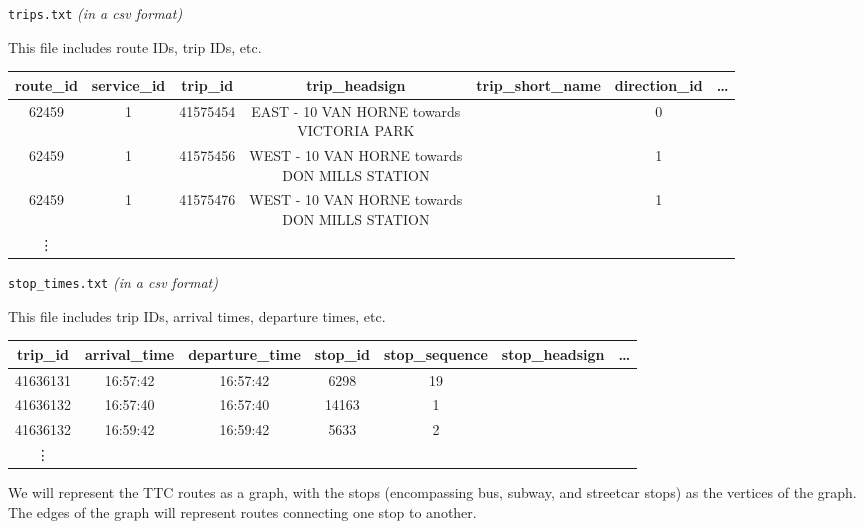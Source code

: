\documentclass[fontsize=11pt]{article}
\begin{document}
    \noindent \texttt{trips.txt} \emph{(in a csv format)}
    
    \noindent This file includes route IDs, trip IDs, etc.
    \begin{center}
    	\begin{tabular}{| c | c | c | c | c | c | c |}
    		\hline 
    		route\_id & service\_id & trip\_id & trip\_headsign & trip\_short\_name & direction\_id & \ldots \\
    		\hline
    		62459 & 1 & 41575454 & \makecell{EAST - 10 VAN HORNE towards \\ VICTORIA PARK} &  & 0 &  \\
    		\hline
    		62459 & 1 & 41575456 & \makecell{WEST - 10 VAN HORNE towards \\ DON MILLS STATION} &  & 1 &  \\
    		\hline
    		62459 & 1 & 41575476 & \makecell{WEST - 10 VAN HORNE towards \\ DON MILLS STATION} &  & 1 &  \\
    		\hline
    		\vdots & & & & & & \\
    		\hline
    	\end{tabular}
    \end{center}
    
    \noindent \texttt{stop\_times.txt} \emph{(in a csv format)}
     
    \noindent This file includes trip IDs, arrival times, departure times, etc.
    \begin{center}
    	\begin{tabular}{| c | c | c | c | c | c | c |}
    		\hline 
    		trip\_id & arrival\_time & departure\_time & stop\_id & stop\_sequence & stop\_headsign & \ldots \\
    		\hline
    		41636131 & 16:57:42 & 16:57:42 & 6298 & 19 &  &  \\
    		\hline
    		41636132 & 16:57:40 & 16:57:40 & 14163 & 1 &  &   \\
    		\hline
    		41636132 & 16:59:42 & 16:59:42 & 5633 & 2 &  &  \\
    		\hline
    		\vdots & & & & & & \\
    		\hline
    	\end{tabular}
    \end{center}

    We will represent the TTC routes as a graph, with the stops (encompassing bus, subway, and streetcar stops) as the vertices of the graph. The edges of the graph will represent routes connecting one stop to another. \\
\end{document}
